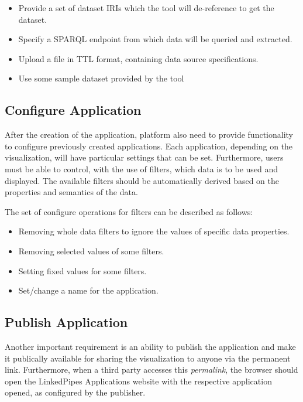\begin{itemize}
\item Provide a set of dataset \acrshort{IRI}s which the tool will de-reference to get the dataset.
\item Specify a \acrshort{SPARQL} endpoint from which data will be queried and extracted.
\item Upload a file in \acrshort{TTL} format, containing data source specifications.
\item Use some sample dataset provided by the tool
\end{itemize}

\subsection{Configure Application}

After the creation of the application, platform also need to provide functionality to configure previously created applications. Each application, depending on the visualization, will have particular settings that can be set. Furthermore, users must be able to control, with the use of filters, which data is to be used and displayed. The available filters should be automatically derived based on the properties and semantics of the data. 

The set of configure operations for filters can be described as follows:

\begin{itemize}
\item Removing whole data filters to ignore the values of specific data properties.
\item Removing selected values of some filters.
\item Setting fixed values for some filters.
\item Set/change a name for the application.
\end{itemize}

\subsection{Publish Application}

Another important requirement is an ability to publish the application and make it publically available for sharing the visualization to anyone via the permanent link. Furthermore, when a third party accesses this \textit{permalink}, the browser should open the LinkedPipes Applications website with the respective application opened, as configured by the publisher.

